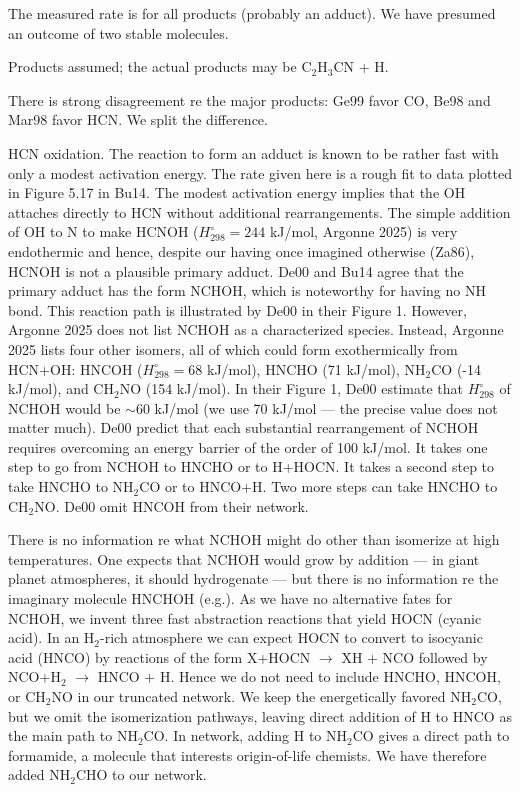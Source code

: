 \documentclass[12pt,landscape]{article}
\newcounter{reaction}
\begin{document}
   The measured rate is for all products (probably an adduct).  We have presumed an outcome of two stable molecules.
 
   Products assumed; the actual products may be C$_2$H$_3$CN + H.

  There is strong disagreement re the major products: Ge99 favor CO, Be98 and Mar98 favor HCN.  We split the difference.

 HCN oxidation.  The reaction to form an adduct is known to be rather fast with only a modest activation energy.
The rate given here is a rough fit to data plotted in Figure 5.17 in Bu14.
The modest activation energy implies that the OH attaches directly to HCN without additional rearrangements.
The simple addition of OH to N to make HCNOH ($H^{\circ}_{298}=244$ kJ/mol, Argonne 2025) is very endothermic and hence, despite our having once imagined otherwise (Za86),
 HCNOH is not a plausible primary adduct.
De00 and Bu14 agree that the primary adduct has the form NCHOH, which is noteworthy for having no NH bond. 
This reaction path is illustrated by De00 in their Figure 1.
However, Argonne 2025 does not list NCHOH as a characterized species.
Instead, Argonne 2025 lists four other isomers, all of which could form exothermically from HCN+OH:
HNCOH ($H^{\circ}_{298}=68$ kJ/mol), HNCHO (71 kJ/mol), NH$_2$CO (-14 kJ/mol), and CH$_2$NO (154 kJ/mol).
In their Figure 1, De00 estimate that $H^{\circ}_{298}$ of NCHOH would be $\sim\!60$ kJ/mol (we use 70 kJ/mol --- the precise value does not matter much). 
De00 predict that each substantial rearrangement of NCHOH requires overcoming an energy barrier of the order of 100 kJ/mol.
It takes one step to go from NCHOH to HNCHO or to H+HOCN.  It takes a second step to take HNCHO to NH$_2$CO or to HNCO+H.
Two more steps can take HNCHO to CH$_2$NO.
De00 omit HNCOH from their network.
  
There is no information re what NCHOH might do other than isomerize at high temperatures. 
One expects that NCHOH would grow by addition --- in giant planet atmospheres, it should hydrogenate --- 
but there is no information re the imaginary molecule HNCHOH (e.g.).
 As we have no alternative fates for NCHOH, we invent three fast abstraction reactions that yield HOCN (cyanic acid).
In an H$_2$-rich atmosphere we can expect HOCN to convert to isocyanic acid (HNCO) by reactions of the form X+HOCN $\rightarrow$ XH + NCO followed
by NCO+H$_2$ $\rightarrow$ HNCO + H. 
Hence we do not need to include HNCHO, HNCOH, or CH$_2$NO in our truncated network.
We keep the energetically favored NH$_2$CO, but we omit the isomerization pathways,
leaving direct addition of H to HNCO as the main path to NH$_2$CO.
 In network, adding H to NH$_2$CO gives a direct path to formamide, a molecule that interests origin-of-life chemists.
 We have therefore added NH$_2$CHO to our network.
 
\end{document}
